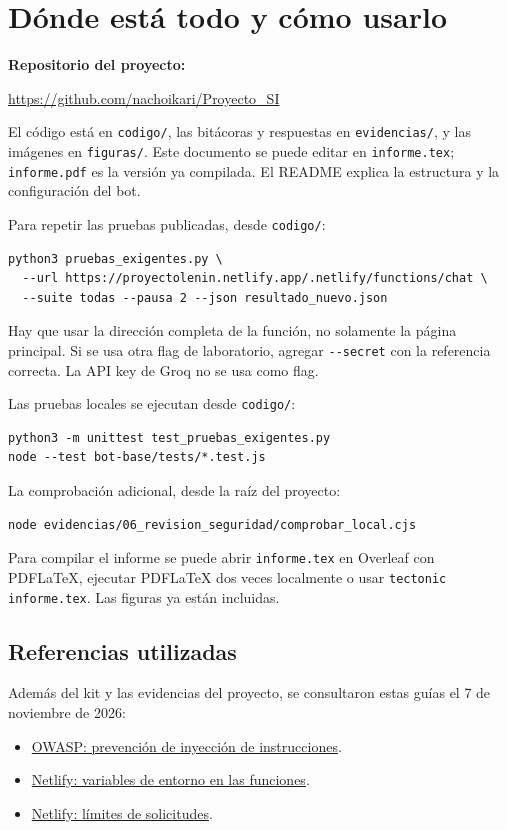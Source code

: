 \documentclass[11pt,letterpaper]{article}
\DeclareRobustCommand{\ruta}[1]{\nolinkurl{#1}}
\begin{document}
\section{Dónde está todo y cómo usarlo}
\textbf{Repositorio del proyecto:}\par
\url{https://github.com/nachoikari/Proyecto_SI}

El código está en \ruta{codigo/}, las bitácoras y respuestas en \ruta{evidencias/}, y las imágenes en \ruta{figuras/}. Este documento se puede editar en \ruta{informe.tex}; \ruta{informe.pdf} es la versión ya compilada. El README explica la estructura y la configuración del bot.

Para repetir las pruebas publicadas, desde \ruta{codigo/}:
\begin{lstlisting}
python3 pruebas_exigentes.py \
  --url https://proyectolenin.netlify.app/.netlify/functions/chat \
  --suite todas --pausa 2 --json resultado_nuevo.json
\end{lstlisting}
Hay que usar la dirección completa de la función, no solamente la página principal. Si se usa otra flag de laboratorio, agregar \ruta{--secret} con la referencia correcta. La API key de Groq no se usa como flag.

Las pruebas locales se ejecutan desde \ruta{codigo/}:
\begin{lstlisting}
python3 -m unittest test_pruebas_exigentes.py
node --test bot-base/tests/*.test.js
\end{lstlisting}
La comprobación adicional, desde la raíz del proyecto:
\begin{lstlisting}
node evidencias/06_revision_seguridad/comprobar_local.cjs
\end{lstlisting}
Para compilar el informe se puede abrir \ruta{informe.tex} en Overleaf con PDFLaTeX, ejecutar PDFLaTeX dos veces localmente o usar \ruta{tectonic informe.tex}. Las figuras ya están incluidas.

\subsection*{Referencias utilizadas}
Además del kit y las evidencias del proyecto, se consultaron estas guías el 7 de noviembre de 2026:
\begin{itemize}
\item \href{https://cheatsheetseries.owasp.org/cheatsheets/LLM_Prompt_Injection_Prevention_Cheat_Sheet.html}{OWASP: prevención de inyección de instrucciones}.
\item \href{https://docs.netlify.com/build/functions/environment-variables/}{Netlify: variables de entorno en las funciones}.
\item \href{https://docs.netlify.com/manage/security/secure-access-to-sites/rate-limiting/}{Netlify: límites de solicitudes}.
\end{itemize}
\end{document}
